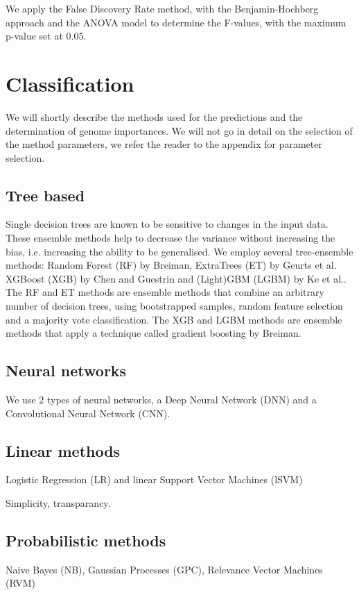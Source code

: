 \documentclass[a4paper,10pt]{article}
\begin{document}
We apply the False Discovery Rate method, with the Benjamin-Hochberg approach and the ANOVA model
to determine the F-values, with the maximum p-value set at $0.05$. %
%
\section{Classification}
%
We will shortly describe the methods used for the predictions and the determination of genome importances.
We will not go in detail on the selection of the method parameters, we refer the reader to the appendix for 
parameter selection.

\subsection{Tree based}

Single decision trees are known to be sensitive to changes in the input data. These ensemble methods 
help to decrease the variance without increasing the bias, i.e. increasing the ability to be generalised.
We employ several tree-ensemble methods: Random Forest (RF) by Breiman\cite{Breiman2001}, ExtraTrees (ET) by Geurts et al.\cite{Geurts2006} 
XGBoost (XGB) by Chen and Guestrin\cite{Chen2016} and (Light)GBM (LGBM) by Ke et al.\cite{Key2017}.
The RF and ET methods are ensemble methods that combine an arbitrary number of decision trees, using bootstrapped samples,
random feature selection and a majority vote classification. The XGB and LGBM methods are ensemble methods 
that apply a technique called gradient boosting by Breiman\cite{Breiman1997}.
%
\subsection{Neural networks}

We use $2$ types of neural networks, a Deep Neural Network (DNN) and a Convolutional Neural Network (CNN). 

\subsection{Linear methods}

Logistic Regression (LR) and linear Support Vector Machines (lSVM)

Simplicity, transparancy.

\subsection{Probabilistic methods}
%
Naive Bayes (NB), Gaussian Processes (GPC), Relevance Vector Machines (RVM)
\end{document}

